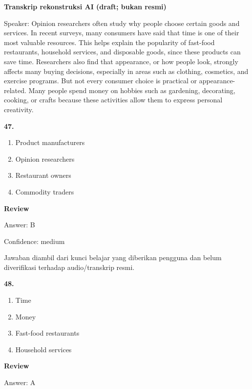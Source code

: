 \documentclass[12pt]{article}
\begin{document}
\begin{exampleblock}
\textbf{Transkrip rekonstruksi AI (draft; bukan resmi)}\par
Speaker: Opinion researchers often study why people choose certain goods and services. In recent surveys, many consumers have said that time is one of their most valuable resources. This helps explain the popularity of fast-food restaurants, household services, and disposable goods, since these products can save time. Researchers also find that appearance, or how people look, strongly affects many buying decisions, especially in areas such as clothing, cosmetics, and exercise programs. But not every consumer choice is practical or appearance-related. Many people spend money on hobbies such as gardening, decorating, cooking, or crafts because these activities allow them to express personal creativity.\par
\end{exampleblock}
\noindent\textbf{47.}
\begin{enumerate}[label=(\Alph*),leftmargin=*,itemsep=0.2em]
\item Product manufacturers
\item Opinion researchers
\item Restaurant owners
\item Commodity traders
\end{enumerate}
\par
\begingroup
\setlength{\parskip}{0pt}
\setlength{\parindent}{0pt}
\textbf{Review}\par
Answer: B\par
Confidence: medium\par
Jawaban diambil dari kunci belajar yang diberikan pengguna dan belum diverifikasi terhadap audio/transkrip resmi.\par
\endgroup
\par
\vspace{0.25\baselineskip}
\noindent\textbf{48.}
\begin{enumerate}[label=(\Alph*),leftmargin=*,itemsep=0.2em]
\item Time
\item Money
\item Fast-food restaurants
\item Household services
\end{enumerate}
\par
\begingroup
\setlength{\parskip}{0pt}
\setlength{\parindent}{0pt}
\textbf{Review}\par
Answer: A\par
\end{document}
